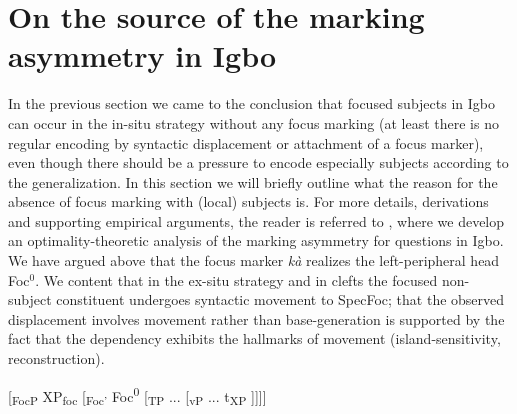 \documentclass[output=paper,colorlinks,citecolor=brown]{langscibook}
\begin{document}
\section{On the source of the marking asymmetry in Igbo}\label{sec:amaechi:5}

In the previous section we came to the conclusion that focused subjects in Igbo can occur in the in-situ strategy without any focus marking  (at least there is no regular encoding by syntactic displacement or attachment of a focus marker), even though there should be a pressure to encode especially subjects according to the \citeauthor{FiedlerEtAl2010} generalization. In this section we will briefly outline what the reason for the absence of focus marking with (local) subjects is. For more details, derivations and supporting empirical arguments, the reader is referred to \citet{AmaechiGeorgi2019}, where we develop an optimality-theoretic analysis of the marking asymmetry for questions in Igbo. We have argued above that the focus marker \textit{k\`a} realizes the left-peripheral head Foc$^{0}$. We content that in the ex-situ strategy and in clefts the focused non-subject constituent undergoes syntactic movement to SpecFoc; that the observed displacement involves movement rather than base-generation is supported by the fact that the dependency exhibits the hallmarks of movement (island-sensitivity, reconstruction).

\ea%
    \label{ex:amaechi:15}
    [\textsubscript{{FocP}} XP\textsubscript{{foc}} [\textsubscript{{Foc'}} Foc\textsuperscript{0} [\textsubscript{{TP}} ... [\textsubscript{{vP}} ... t\textsubscript{{XP}} ]]]]
\z
\end{document}
